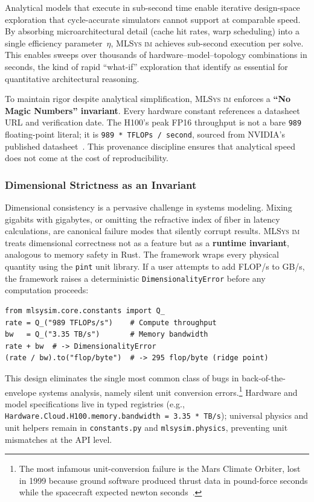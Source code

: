 \documentclass[10pt,twocolumn]{article}
\newcommand{\mlsysim}{\mbox{\textsc{MLSys}\,\textperiodcentered\,\textsc{im}}\xspace}
\begin{document}
Analytical models that execute in sub-second time enable iterative design-space exploration that cycle-accurate simulators cannot support at comparable speed. By absorbing microarchitectural detail (cache hit rates, warp scheduling) into a single efficiency parameter~$\eta$, \mlsysim achieves sub-second execution per solve. This enables sweeps over thousands of hardware--model--topology combinations in seconds, the kind of rapid ``what-if'' exploration that \citet{hennessy2024architecture} identify as essential for quantitative architectural reasoning.

To maintain rigor despite analytical simplification, \mlsysim enforces a \textbf{``No Magic Numbers'' invariant}. Every hardware constant references a datasheet URL and verification date. The H100's peak FP16 throughput is not a bare \texttt{989} floating-point literal; it is \texttt{989\,*\,TFLOPs\,/\,second}, sourced from NVIDIA's published datasheet~\citep{nvidia2023h100}. This provenance discipline ensures that analytical speed does not come at the cost of reproducibility.

\subsubsection{Dimensional Strictness as an Invariant}
\label{sec:dimensional}

Dimensional consistency is a pervasive challenge in systems modeling. Mixing gigabits with gigabytes, or omitting the refractive index of fiber in latency calculations, are canonical failure modes that silently corrupt results. \mlsysim treats dimensional correctness not as a feature but as a \textbf{runtime invariant}, analogous to memory safety in Rust. The framework wraps every physical quantity using the \texttt{pint} unit library. If a user attempts to add FLOP/s to GB/s, the framework raises a deterministic \texttt{DimensionalityError} before any computation proceeds:

\begin{lstlisting}[caption={\textbf{Dimensional Strictness.} Prevents silent unit errors at the API level.},label={lst:units}]
from mlsysim.core.constants import Q_
rate = Q_("989 TFLOPs/s")    # Compute throughput
bw   = Q_("3.35 TB/s")       # Memory bandwidth
rate + bw  # -> DimensionalityError
(rate / bw).to("flop/byte")  # -> 295 flop/byte (ridge point)
\end{lstlisting}

This design eliminates the single most common class of bugs in back-of-the-envelope systems analysis, namely silent unit conversion errors.\footnote{The most infamous unit-conversion failure is the Mars Climate Orbiter, lost in 1999 because ground software produced thrust data in pound-force seconds while the spacecraft expected newton seconds~\citep{stephenson1999mco}.} Hardware and model specifications live in typed registries (e.g., \texttt{Hardware.Cloud.H100.memory.bandwidth = 3.35\,*\,TB/s}); universal physics and unit helpers remain in \texttt{constants.py} and \texttt{mlsysim.physics}, preventing unit mismatches at the API level.
\end{document}
